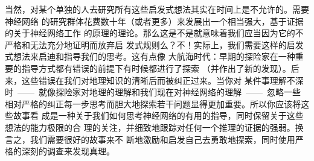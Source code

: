 当然，对某个单独的人去研究所有这些启发式想法其实在时间上是不允许的。需要神经网络
的研究群体花费数十年（或者更多）来发展出一个相当强大，基于证据的关于神经网络工作
的原理的理论。那么这是不是就意味着我们应当因为它的不严格和无法充分地证明而放弃启
发式规则么？不！实际上，我们需要这样的启发式想法来启迪和指导我们的思考。这有点像
大航海时代：早期的探险家在一种重要的指导方式都有错误的前提下有时候都进行了探索
（并作出了新的发现）。后来，这些错误在我们对地理知识的清晰后而被纠正过来。当你对
某件事理解不深时~——~就像探险家对地理的理解和我们现在对神经网络的理解~——~忽略一些
相对严格的纠正每一步思考而胆大地探索若干问题显得更加重要。所以你应该将这些故事看
成是一种关于我们如何思考神经网络的有用的指导，同时保留关于这些想法的能力极限的合
理的关注，并细致地跟踪对任何一个推理的证据的强弱。换言之，我们需要很好的故事来不
断地激励和启发自己去勇敢地探索，同时使用严格的深刻的调查来发现真理。
